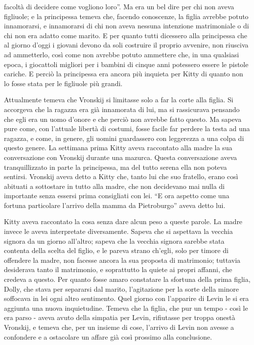 facoltà di decidere come vogliono loro''. Ma era un bel dire per chi non aveva figliuole; e la principessa temeva che, facendo conoscenze, la figlia avrebbe potuto innamorarsi, e innamorarsi di chi non aveva nessuna intenzione matrimoniale o di chi non era adatto come marito. E per quanto tutti dicessero alla principessa che al giorno d'oggi i giovani devono da soli costruire il proprio avvenire, non riusciva ad ammetterlo, così come non avrebbe potuto ammettere che, in una qualsiasi epoca, i giocattoli migliori per i bambini di cinque anni potessero essere le pistole cariche. E perciò la principessa era ancora più inquieta per Kitty di quanto non lo fosse stata per le figliuole più grandi. 

Attualmente temeva che Vronskij si limitasse solo a far la corte alla figlia. Si accorgeva che la ragazza era già innamorata di lui, ma si rassicurava pensando che egli era un uomo d'onore e che perciò non avrebbe fatto questo. Ma sapeva pure come, con l'attuale libertà di costumi, fosse facile far perdere la testa ad una ragazza, e come, in genere, gli uomini guardassero con leggerezza a una colpa di questo genere. La settimana prima Kitty aveva raccontato alla madre la sua conversazione con Vronskij durante una mazurca. Questa conversazione aveva tranquillizzato in parte la principessa, ma del tutto serena ella non poteva sentirsi. Vronskij aveva detto a Kitty che, tanto lui che suo fratello, erano così abituati a sottostare in tutto alla madre, che non decidevano mai nulla di importante senza essersi prima consigliati con lei. ``E ora aspetto come una fortuna particolare l'arrivo della mamma da Pietroburgo'' aveva detto lui. 

Kitty aveva raccontato la cosa senza dare alcun peso a queste parole. La madre invece le aveva interpretate diversamente. Sapeva che si aspettava la vecchia signora da un giorno all'altro; sapeva che la vecchia signora sarebbe stata contenta della scelta del figlio, e le pareva strano ch'egli, solo per timore di offendere la madre, non facesse ancora la sua proposta di matrimonio; tuttavia desiderava tanto il matrimonio, e soprattutto la quiete ai propri affanni, che credeva a questo. Per quanto fosse amaro constatare la sfortuna della prima figlia, Dolly, che stava per separarsi dal marito, l'agitazione per la sorte della minore soffocava in lei ogni altro sentimento. Quel giorno con l'apparire di Levin le si era aggiunta una nuova inquietudine. Temeva che la figlia, che pur un tempo - così le era parso - aveva avuto della simpatia per Levin, rifiutasse per troppa onestà Vronskij, e temeva che, per un insieme di cose, l'arrivo di Levin non avesse a confondere e a ostacolare un affare già così prossimo alla conclusione. 

